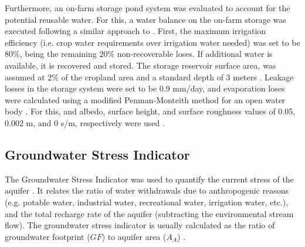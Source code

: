 Furthermore, an on-farm storage pond system was evaluated to account for the potential reusable water. For this, a water balance on the on-farm storage was executed following a similar approach to \citet{reinhartSimulatedWaterQuality2019}. First, the maximum irrigation efficiency (i.e. crop water requirements over irrigation water needed) was set to be 80\%, being the remaining 20\% non-recoverable loses. If additional water is available, it is recovered and stored. The storage reservoir surface area, was assumed at 2\% of the cropland area and a standard depth of 3 meters \cite{reinhartSimulatedWaterQuality2019}. Leakage losses in the storage system were set to be 0.9 mm/day, and evaporation loses were calculated using a modified Penman-Monteith method for an open water body \cite{reinhartSimulatedWaterQuality2019}. For this, and albedo, surface height, and surface roughness values of 0.05, 0.002 m, and 0 s/m, respectively were used \cite{princeczarneckijobym.QuantifyingCaptureUse2017}.

\subsection{Groundwater Stress Indicator}
The Groundwater Stress Indicator was used to quantify the current stress of the aquifer \cite{Aqueductglobalmaps2015}. It relates the ratio of water withdrawals due to anthropogenic reasons (e.g. potable water, industrial water, recreational water, irrigation water, etc.), and the total recharge rate of the aquifer (subtracting the environmental stream flow). The groundwater stress indicator is usually calculated as the ratio of groundwater footprint ($GF$) to aquifer area ($A_A$) \cite{RegionalGroundwaterStress2013}.




